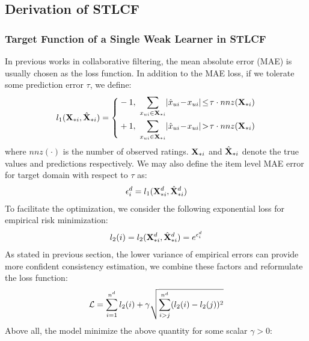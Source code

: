 \hspace{0.05in}
\subsection{Derivation of STLCF}
\label{sec:derivationSTLCF}
\subsubsection{Target Function of a Single Weak Learner in STLCF}
In previous works in collaborative filtering, the mean absolute error (MAE) is usually chosen as the loss function. In addition to the MAE loss, if we tolerate some prediction error $\tau$, we define:
\begin{equation}
l_1(\X_{* i},\hat \X_{* i})=\left\{ \begin{aligned}
         &-1, & \!\!\!\sum_{x_{ui}\in\X_{* i}}\!|\hat x_{ui}\!-\!x_{ui}| \!\leq\! \tau \cdot nnz(\X_{* i})\\
         &+1, & \!\!\!\sum_{x_{ui}\in\X_{* i}}\!|\hat x_{ui}\!-\!x_{ui}| \!>\! \tau \cdot nnz(\X_{* i})\\
                          \end{aligned} \right.
\end{equation}
where $nnz(\cdot)$ is the number of observed ratings. $\mathbf{X}_{* i}$ and $\hat {\mathbf{X}}_{* i}$ denote the true values and predictions respectively.
We may also define the item level MAE error for target domain with respect to $\tau$ as:
\begin{eqnarray}\label{eq:mae_loss}
    \epsilon^{d}_i = l_1(\mathbf{X}^{d}_{* i}, \hat {\mathbf{X}}^{d}_{* i})
\end{eqnarray}
To facilitate the optimization, we consider the following exponential loss for empirical risk minimization:
\begin{eqnarray}\label{eq:exp_loss}
    l_2(i) = l_2(\mathbf{X}^{d}_{* i}, \hat {\mathbf{X}}^{d}_{* i}) = e^{\epsilon^{d}_i}
\end{eqnarray}
As stated in previous section, the lower variance of empirical errors can provide more confident consistency estimation, we combine these factors and reformulate the loss function:
\begin{eqnarray}\label{eq:vpb_loss}
    \mathcal{L} =
    \sum_{i=1}^{n^d} l_2(i) + \gamma\sqrt{\sum_{i>j}^{n^d} (l_2(i)-l_2(j))^2}
\end{eqnarray}
Above all, the model minimize the above quantity for some scalar $\gamma>0$:


